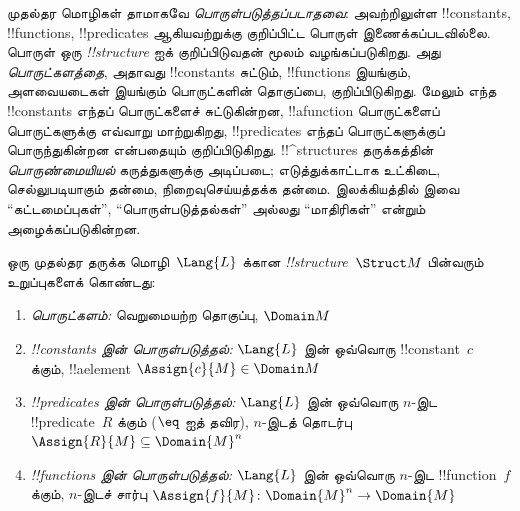 \documentclass[../../../include/open-logic-section]{subfiles}
\begin{document}


\begin{explain}
முதல்தர மொழிகள் தாமாகவே \emph{பொருள்படுத்தப்படாதவை}: அவற்றிலுள்ள
!!{constant}s, !!{function}s, !!{predicate}s ஆகியவற்றுக்கு குறிப்பிட்ட
பொருள் இணைக்கப்படவில்லை. பொருள் ஒரு 
\emph{!!{structure}} ஐக் குறிப்பிடுவதன் மூலம் வழங்கப்படுகிறது. அது
\emph{பொருட்களத்தை}, அதாவது !!{constant}s சுட்டும், !!{function}s இயங்கும்,
அளவையடைகள் இயங்கும் பொருட்களின் தொகுப்பை, குறிப்பிடுகிறது. மேலும் எந்த
!!{constant}s எந்தப் பொருட்களைச் சுட்டுகின்றன, !!a{function} பொருட்களைப்
பொருட்களுக்கு எவ்வாறு மாற்றுகிறது, !!{predicate}s எந்தப் பொருட்களுக்குப்
பொருந்துகின்றன என்பதையும் குறிப்பிடுகிறது. !!^{structure}s தருக்கத்தின்
\emph{பொருண்மையியல்} கருத்துகளுக்கு அடிப்படை; எடுத்துக்காட்டாக உட்கிடை,
செல்லுபடியாகும் தன்மை, நிறைவுசெய்யத்தக்க தன்மை. இலக்கியத்தில் இவை
``கட்டமைப்புகள்'', ``பொருள்படுத்தல்கள்'' அல்லது ``மாதிரிகள்'' என்றும்
அழைக்கப்படுகின்றன.
\end{explain}

\begin{defn}[!!^{structure}s]
ஒரு முதல்தர தருக்க மொழி~$\Lang{L}$ க்கான
 \emph{!!{structure}}~$\Struct M$ பின்வரும்
உறுப்புகளைக் கொண்டது:
\begin{enumerate}
\item \emph{பொருட்களம்:} வெறுமையற்ற தொகுப்பு, $\Domain M$
\item \emph{!!{constant}s இன் பொருள்படுத்தல்:} $\Lang{L}$ இன் ஒவ்வொரு
  !!{constant}~$c$ க்கும், !!a{element} $\Assign{c}{M} \in \Domain M$
\item \emph{!!{predicate}s இன் பொருள்படுத்தல்:} $\Lang{L}$ இன் ஒவ்வொரு
  $n$-இட !!{predicate}~$R$ க்கும் ($\eq$ ஐத் தவிர),
  $n$-இடத் தொடர்பு $\Assign{R}{M} \subseteq \Domain{M}^n$
\item \emph{!!{function}s இன் பொருள்படுத்தல்:} $\Lang{L}$ இன் ஒவ்வொரு
  $n$-இட !!{function}~$f$ க்கும், $n$-இடச் சார்பு
  $\Assign{f}{M} \colon \Domain{M}^n \to \Domain{M}$
\end{enumerate}
\end{defn}
\end{document}
